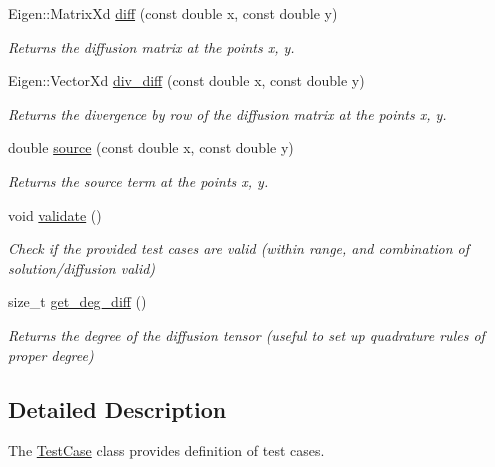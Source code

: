 \begin{DoxyCompactItemize}
Eigen\+::\+Matrix\+Xd \hyperlink{classTestCase_a74093020578afb0e658ae1dc77011b8a}{diff} (const double x, const double y)
\begin{DoxyCompactList}\small\item\em Returns the diffusion matrix at the points x, y. \end{DoxyCompactList}\item 
\mbox{\label{classTestCase_a8a7a5456cfd75fa939179119a9c65955}} 
Eigen\+::\+Vector\+Xd \hyperlink{classTestCase_a8a7a5456cfd75fa939179119a9c65955}{div\+\_\+diff} (const double x, const double y)
\begin{DoxyCompactList}\small\item\em Returns the divergence by row of the diffusion matrix at the points x, y. \end{DoxyCompactList}\item 
\mbox{\label{classTestCase_a0f23ed8e9ad5e04e6599f4cd90fd5fd4}} 
double \hyperlink{classTestCase_a0f23ed8e9ad5e04e6599f4cd90fd5fd4}{source} (const double x, const double y)
\begin{DoxyCompactList}\small\item\em Returns the source term at the points x, y. \end{DoxyCompactList}\item 
\mbox{\label{classTestCase_a1f428652eb476f6eb4973ef1f478e8ce}} 
void \hyperlink{classTestCase_a1f428652eb476f6eb4973ef1f478e8ce}{validate} ()
\begin{DoxyCompactList}\small\item\em Check if the provided test cases are valid (within range, and combination of solution/diffusion valid) \end{DoxyCompactList}\item 
size\+\_\+t \hyperlink{group__TestCases_ga3dd2daaebb012281b252ab65db0045b2}{get\+\_\+deg\+\_\+diff} ()
\begin{DoxyCompactList}\small\item\em Returns the degree of the diffusion tensor (useful to set up quadrature rules of proper degree) \end{DoxyCompactList}\end{DoxyCompactItemize}


\subsection{Detailed Description}
The \hyperlink{classTestCase}{Test\+Case} class provides definition of test cases. 

